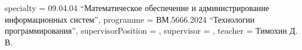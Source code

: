 {    specialty          = {09.04.04 \enquote{Математическое обеспечение и администрирование информационных систем}},
    programme          = {ВМ.5666.2024 \enquote{Технологии программирования}},
    supervisorPosition = {},
    supervisor         = {},
    teacher            = {Тимохин Д. В.}
}

